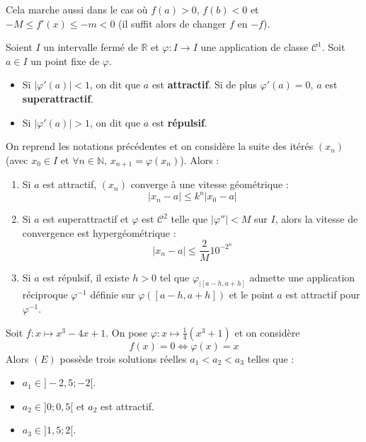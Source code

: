   \begin{remark}
    Cela marche aussi dans le cas où $f(a) > 0$, $f(b) < 0$ et $-M \leq f'(x) \leq -m < 0$ (il suffit alors de changer $f$ en $-f$).
  \end{remark}

  \begin{definition}
    Soient $I$ un intervalle fermé de $\mathbb{R}$ et $\varphi : I \rightarrow I$ une application de classe $\mathcal{C}^1$. Soit $a \in I$ un point fixe de $\varphi$.
    \begin{itemize}
      \item Si $|\varphi'(a)| < 1$, on dit que $a$ est \textbf{attractif}. Si de plus $\varphi'(a) = 0$, $a$ est \textbf{superattractif}.
      \item Si $|\varphi'(a)| > 1$, on dit que $a$ est \textbf{répulsif}.
    \end{itemize}
  \end{definition}

  \begin{proposition}
    On reprend les notations précédentes et on considère la suite des itérés $(x_n)$ (avec $x_0 \in I$ et $\forall n \in \mathbb{N}, \, x_{n+1} = \varphi(x_n)$). Alors :
    \begin{enumerate}[label=(\roman*)]
      \item Si $a$ est attractif, $(x_n)$ converge à une vitesse géométrique :
      \[ |x_n - a| \leq k^n |x_0 - a| \]
      \item Si $a$ est superattractif et $\varphi$ est $\mathcal{C}^2$ telle que $|\varphi''| < M$ sur $I$, alors la vitesse de convergence est hypergéométrique :
      \[ |x_n - a| \leq \frac{2}{M} 10^{-2^n} \]
      \item Si $a$ est répulsif, il existe $h > 0$ tel que $\varphi_{|[a-h, a+h]}$ admette une application réciproque $\varphi^{-1}$ définie sur $\varphi([a-h, a+h])$ et le point $a$ est attractif pour $\varphi^{-1}$.
    \end{enumerate}
  \end{proposition}

  \begin{example}
    Soit $f : x \mapsto x^3 - 4x + 1$. On pose $\varphi : x \mapsto \frac{1}{4} (x^3 + 1)$ et on considère
    \[ f(x) = 0 \iff \varphi(x) = x \tag{$E$} \]
    Alors $(E)$ possède trois solutions réelles $a_1 < a_2 < a_3$ telles que :
    \begin{itemize}
      \item $a_1 \in ]-2,5; -2[$.
      \item $a_2 \in ]0; 0,5[$ et $a_2$ est attractif.
      \item $a_3 \in ]1,5; 2[$.
    \end{itemize}
  \end{example}

